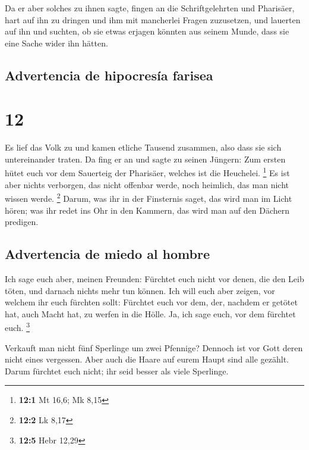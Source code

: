  Da er aber solches zu ihnen sagte, fingen an die
Schriftgelehrten und Pharisäer, hart auf ihn zu dringen und ihm mit
mancherlei Fragen zuzusetzen,  und lauerten auf ihn und
suchten, ob sie etwas erjagen könnten aus seinem Munde, dass sie eine
Sache wider ihn hätten.

\hypertarget{advertencia-de-hipocresuxeda-farisea}{%
\subsection{Advertencia de hipocresía
farisea}\label{advertencia-de-hipocresuxeda-farisea}}

\hypertarget{section-11}{%
\section{12}\label{section-11}}

 Es lief das Volk zu und kamen etliche Tausend zusammen,
also dass sie sich untereinander traten. Da fing er an und sagte zu
seinen Jüngern: Zum ersten hütet euch vor dem Sauerteig der Pharisäer,
welches ist die Heuchelei. \footnote{\textbf{12:1} Mt 16,6; Mk 8,15}
 Es ist aber nichts verborgen, das nicht offenbar werde,
noch heimlich, das man nicht wissen werde. \footnote{\textbf{12:2} Lk
  8,17}  Darum, was ihr in der Finsternis saget, das wird
man im Licht hören; was ihr redet ins Ohr in den Kammern, das wird man
auf den Dächern predigen.

\hypertarget{advertencia-de-miedo-al-hombre}{%
\subsection{Advertencia de miedo al
hombre}\label{advertencia-de-miedo-al-hombre}}

 Ich sage euch aber, meinen Freunden: Fürchtet euch nicht
vor denen, die den Leib töten, und darnach nichts mehr tun können.
 Ich will euch aber zeigen, vor welchem ihr euch fürchten
sollt: Fürchtet euch vor dem, der, nachdem er getötet hat, auch Macht
hat, zu werfen in die Hölle. Ja, ich sage euch, vor dem fürchtet euch.
\footnote{\textbf{12:5} Hebr 12,29}

 Verkauft man nicht fünf Sperlinge um zwei Pfennige?
Dennoch ist vor Gott deren nicht eines vergessen.  Aber
auch die Haare auf eurem Haupt sind alle gezählt. Darum fürchtet euch
nicht; ihr seid besser als viele Sperlinge.

